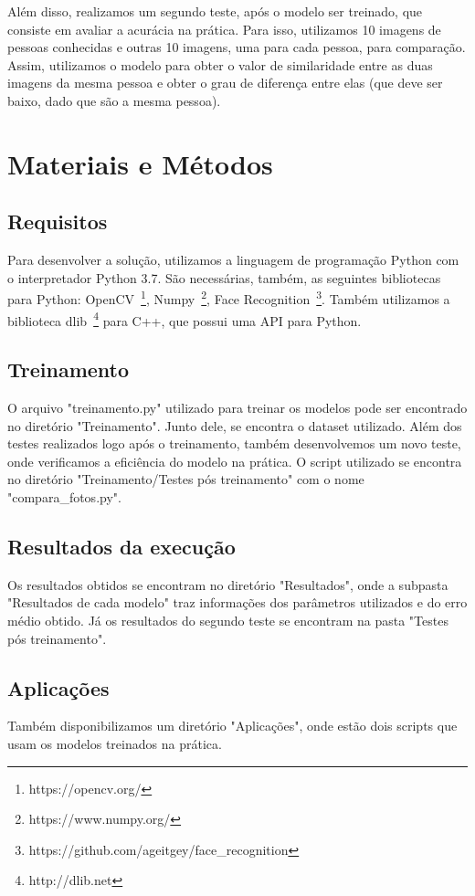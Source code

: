 \documentclass[twoside,conference,a4paper]{IEEEtran}
\begin{document}
Além disso, realizamos um segundo teste, após o modelo ser treinado, que consiste em avaliar a acurácia na prática. Para isso, utilizamos 10 imagens de pessoas conhecidas e outras 10 imagens, uma para cada pessoa, para comparação. Assim, utilizamos o modelo para obter o valor de similaridade entre as duas imagens da mesma pessoa e obter o grau de diferença entre elas (que deve ser baixo, dado que são a mesma pessoa).

\section{Materiais e Métodos}

\subsection{Requisitos}
Para desenvolver a solução, utilizamos a linguagem de programação Python com o  interpretador Python 3.7. São necessárias, também, as seguintes bibliotecas para Python: OpenCV~\footnote{https://opencv.org/}, Numpy~\footnote{https://www.numpy.org/}, Face Recognition~\footnote{https://github.com/ageitgey/face\_recognition}. Também utilizamos a biblioteca dlib~\footnote{http://dlib.net} para C++, que possui uma API para Python.

\subsection{Treinamento}
O arquivo "treinamento.py" utilizado para treinar os modelos pode ser encontrado no diretório "Treinamento". Junto dele, se encontra o dataset utilizado.
Além dos testes realizados logo após o treinamento, também desenvolvemos um novo teste, onde verificamos a eficiência do modelo na prática. O script utilizado se encontra no diretório "Treinamento/Testes pós treinamento" com o nome "compara\_fotos.py".

\subsection{Resultados da execução}
Os resultados obtidos se encontram no diretório "Resultados", onde a subpasta "Resultados de cada modelo" traz informações dos parâmetros utilizados e do erro médio obtido. Já os resultados do segundo teste se encontram na pasta "Testes pós treinamento".

\subsection{Aplicações}
Também disponibilizamos um diretório "Aplicações", onde estão dois scripts que usam os modelos treinados na prática. 
\end{document}
